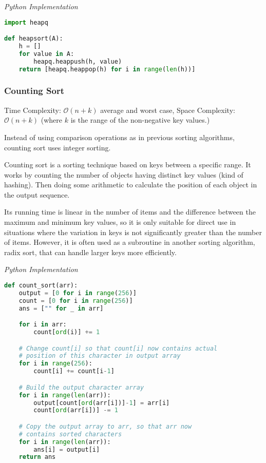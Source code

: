 \documentclass{article}
\newcommand{\bigO}{\ensuremath{\mathcal{O}}}
\begin{document}
\vspace{8pt} \emph{Python Implementation}
\begin{lstlisting}[language=Python]
import heapq

def heapsort(A):
    h = []
    for value in A:
        heapq.heappush(h, value)
    return [heapq.heappop(h) for i in range(len(h))]
\end{lstlisting}

    \subsubsection{Counting Sort}
    Time Complexity: $\bigO(n + k)$ average and worst case, Space Complexity: $\bigO(n + k)$ (where $k$ is the range of the non-negative key values.)
    
    Instead of using comparison operations as in previous sorting algorithms, counting sort uses integer sorting.

    Counting sort is a sorting technique based on keys between a specific range. It works by counting the number of objects having distinct key values (kind of hashing). Then doing some arithmetic to calculate the position of each object in the output sequence.
    
     Its running time is linear in the number of items and the difference between the maximum and minimum key values, so it is only suitable for direct use in situations where the variation in keys is not significantly greater than the number of items. However, it is often used as a subroutine in another sorting algorithm, radix sort, that can handle larger keys more efficiently.

\vspace{8pt} \emph{Python Implementation}
\begin{lstlisting}[language=Python]
def count_sort(arr):
    output = [0 for i in range(256)]
    count = [0 for i in range(256)]
    ans = ["" for _ in arr]

    for i in arr:
        count[ord(i)] += 1

    # Change count[i] so that count[i] now contains actual
    # position of this character in output array
    for i in range(256):
        count[i] += count[i-1]

    # Build the output character array
    for i in range(len(arr)):
        output[count[ord(arr[i])]-1] = arr[i]
        count[ord(arr[i])] -= 1

    # Copy the output array to arr, so that arr now
    # contains sorted characters
    for i in range(len(arr)):
        ans[i] = output[i]
    return ans
\end{lstlisting}
\end{document}
